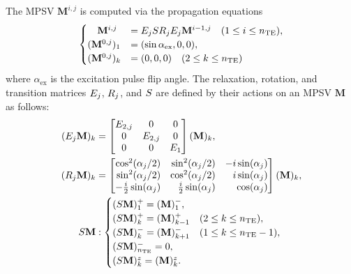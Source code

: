 The \gls*{MPSV} $\mathbf{M}^{i,j}$ is computed via the propagation equations
\begin{align}\label{eqn:mpsv_definition}
    \begin{cases}
        \quad \mathbf{M}^{i,j} & = E_{j} S R_{j} E_{j} \mathbf{M}^{i-1,j} \quad (1 \leq i \leq n_{\mathrm{TE}}), \\
        (\mathbf{M}^{0,j})_{1} & = (\sin\alpha_{\text{ex}}, 0, 0),                                                           \\
        (\mathbf{M}^{0,j})_{k} & = (0, 0, 0) \quad (2 \leq k \leq n_{\mathrm{TE}})
    \end{cases}
\end{align}
where $\alpha_{\text{ex}}$ is the excitation pulse flip angle.
The relaxation, rotation, and transition matrices $E_{j}$, $R_{j}$, and $S$ are defined by their actions on an \gls*{MPSV} $\mathbf{M}$ as follows:
\begin{align}\label{eqn:epg_basis_components}
    (\vv{E}_{j} \mathbf{M})_{k} & =
    \begin{bmatrix}
        E_{2,j} & 0       & 0     \\
        0       & E_{2,j} & 0     \\
        0       & 0       & E_{1}
    \end{bmatrix}
    (\mathbf{M})_{k},               \\
    (\vv{R}_{j} \mathbf{M})_{k} & =
    \begin{bmatrix*}[r]
        \cos^2(\alpha_{j}/2)           & \sin^2(\alpha_{j}/2)          & -i \sin(\alpha_{j}) \\
        \sin^2(\alpha_{j}/2)           & \cos^2(\alpha_{j}/2)          &  i \sin(\alpha_{j}) \\
        -\tfrac{i}{2} \sin(\alpha_{j}) & \tfrac{i}{2} \sin(\alpha_{j}) &    \cos(\alpha_{j})
    \end{bmatrix*}
    (\mathbf{M})_{k},               \\
    \vv{S} \mathbf{M}           & :
    \begin{cases}
        (\vv{S} \mathbf{M})_1^+           = (\mathbf{M})_1^-,                                       \\
        (\vv{S} \mathbf{M})_k^+           = (\mathbf{M})_{k-1}^+ \quad (2 \leq k \leq n_{\TE}),     \\
        (\vv{S} \mathbf{M})_k^-           = (\mathbf{M})_{k+1}^- \quad (1 \leq k \leq n_{\TE} - 1), \\
        (\vv{S} \mathbf{M})_{n_{\TE}}^-   = 0,                                                      \\
        (\vv{S} \mathbf{M})_k^z           = (\mathbf{M})_k^z.
    \end{cases}
\end{align}
